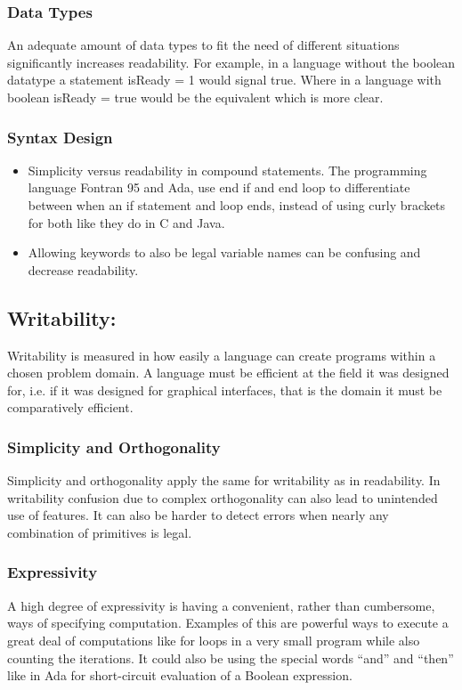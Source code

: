 \subsubsection*{Data Types}
An adequate amount of data types to fit the need of different situations significantly increases readability. For example, in a language without the boolean datatype a statement
isReady = 1 would signal true. Where in a language with boolean isReady = true would be the equivalent which is more clear.

\subsubsection*{Syntax Design}
\begin{itemize}
 \item Simplicity versus readability in compound statements. The programming language Fontran 95 and Ada, use end if and end loop to differentiate between when an if statement and loop ends, instead of using curly brackets for both like they do in C and Java.
\item Allowing keywords to also be legal variable names can be confusing and decrease readability.
\end{itemize}

\subsection*{Writability:}
Writability is measured in how easily a language can create programs within a chosen problem domain.
A language must be efficient at the field it was designed for, i.e. if it was designed for graphical interfaces, that is the domain it must be comparatively efficient.
\subsubsection*{Simplicity and Orthogonality}
Simplicity and orthogonality apply the same for writability as in readability. In writability confusion due to complex orthogonality can also lead to unintended use of features. It can also be harder to detect errors when nearly any combination of primitives is legal.
\subsubsection*{Expressivity}
A high degree of expressivity is having a convenient, rather than cumbersome, ways of specifying computation. Examples of this are powerful ways to execute a great deal of computations like for loops in a very small program while also counting the iterations. It could also be using the special words “and” and “then” like in Ada for short-circuit evaluation of a Boolean expression.

